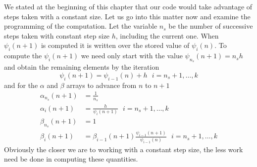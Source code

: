 We stated at the beginning of this chapter that our code would take
advantage of steps taken with a constant size. Let us go into this matter
now and examine the programming of the computation.
Let the variable $n_s$ be the number of successive steps taken with constant 
step size $h$, including the current one. When $\psi _i(n+1)$ is computed it is 
written over the stored value of $\psi _i(n)$.
To compute the $\psi _{i}(n+1)$ we need only start with the value 
$\psi _{n_s}(n+1) = n_s h$ and obtain the remaining elements by the iteration 
\begin{equation}
    \psi _{i}(n+1) = \psi _{i-1}(n) + h \text{ } i= n_s+1 , \dots , k
\end{equation}
and for the $\alpha$ and $\beta$ arrays to advance from $n$ to $n+1$
\begin{equation}
    \begin{aligned}
        \alpha _{n_s} (n+1) &= \frac{1}{n_s} \\
        \alpha _{i} (n+1)   &= \frac{h}{\psi _i(n+1)} \text{ } i= n_s+1, \dots ,k \\
        \beta _{n_s} (n+1)  &= 1 \\
        \beta _{i} (n+1)    &= \beta _{i-1} (n+1) \frac{\psi _{i-1}(n+1)}{\psi _{i-1}(n)} 
            \text{ } i= n_s +1 , \dots ,k
    \end{aligned}
\end{equation}
Obviously the closer we are to working with a constant step size, the less
work need be done in computing these quantities.